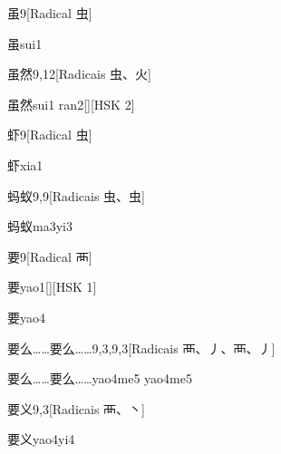 \begin{entry}{虽}{9}[Radical ⾍]
  \begin{phonetics}{虽}{sui1}
  \end{phonetics}
\end{entry}

\begin{entry}{虽然}{9,12}[Radicais ⾍、⽕]
  \begin{phonetics}{虽然}{sui1 ran2}[][HSK 2]
  \end{phonetics}
\end{entry}

\begin{entry}{虾}{9}[Radical ⾍]
  \begin{phonetics}{虾}{xia1}
  \end{phonetics}
\end{entry}

\begin{entry}{蚂蚁}{9,9}[Radicais ⾍、⾍]
  \begin{phonetics}{蚂蚁}{ma3yi3}
  \end{phonetics}
\end{entry}

\begin{entry}{要}{9}[Radical ⾑]
  \begin{phonetics}{要}{yao1}[][HSK 1]
  \end{phonetics}
  \begin{phonetics}{要}{yao4}
  \end{phonetics}
\end{entry}

\begin{entry}{要么……要么……}{9,3,9,3}[Radicais ⾑、⼃、⾑、⼃]
  \begin{phonetics}{要么……要么……}{yao4me5 yao4me5}
  \end{phonetics}
\end{entry}

\begin{entry}{要义}{9,3}[Radicais ⾑、⼂]
  \begin{phonetics}{要义}{yao4yi4}
  \end{phonetics}
\end{entry}

